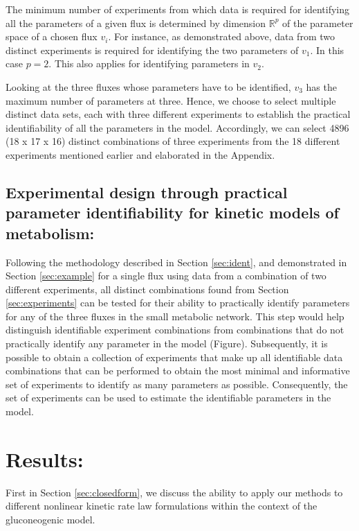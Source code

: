 \documentclass[10pt]{article}
\begin{document}
The minimum number of experiments from which data is required for identifying all the parameters of a given flux is determined by dimension $\mathbb{R}^p$ of the parameter space of a chosen flux $v_i$. For instance, as demonstrated above, data from two distinct experiments is required for identifying the two parameters of $v_1$. In this case $p=2$. This also applies for identifying parameters in $v_2$.

Looking at the three fluxes whose parameters have to be identified, $v_3$ has the maximum number of parameters at three. Hence, we choose to select multiple distinct data sets, each with three different experiments to establish the practical identifiability of all the parameters in the model. Accordingly, we can select 4896 (18 x 17 x 16) distinct combinations of three experiments from the 18 different experiments mentioned earlier and elaborated in the Appendix. 

\subsection{Experimental design through practical parameter identifiability for kinetic models of metabolism:}
Following the methodology described in Section \ref{sec:ident}, and demonstrated in Section \ref{sec:example} for a single flux using data from a combination of two different experiments, all distinct combinations found from Section \ref{sec:experiments} can be tested for their ability to practically identify parameters for any of the three fluxes in the small metabolic network. This step would help distinguish identifiable experiment combinations from combinations that do not practically identify any parameter in the model (Figure).
Subsequently, it is possible to obtain a collection of experiments that make up all identifiable data combinations that can be performed to obtain the most minimal and informative set of experiments to identify as many parameters as possible. Consequently, the set of experiments can be used to estimate the identifiable parameters in the model.

\section{Results:}
First in Section \ref{sec:closedform}, we discuss the ability to apply our methods to different nonlinear kinetic rate law formulations within the context of the gluconeogenic model. %
\end{document}
